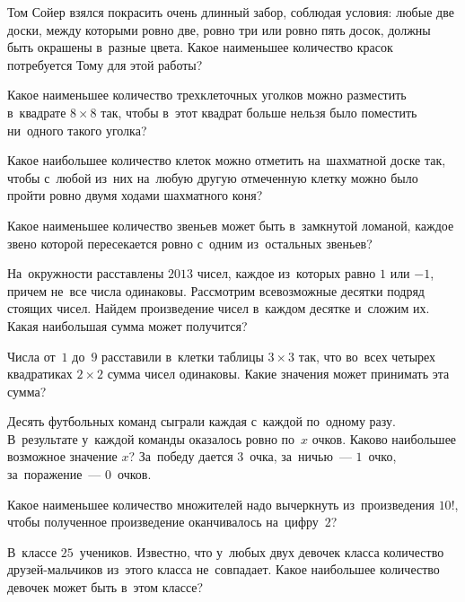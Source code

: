 \begin{problems}

\item
Том Сойер взялся покрасить очень длинный забор, соблюдая условия: любые две
доски, между которыми ровно две, ровно три или ровно пять досок, должны быть
окрашены в~разные цвета.
Какое наименьшее количество красок потребуется Тому для этой работы?

\item
Какое наименьшее количество трехклеточных уголков можно разместить
в~квадрате $8 \times 8$ так, чтобы в~этот квадрат больше нельзя было поместить
ни~одного такого уголка?

\item
Какое наибольшее количество клеток можно отметить на~шахматной доске так, чтобы
с~любой из~них на~любую другую отмеченную клетку можно было пройти ровно двумя
ходами шахматного коня?

\item
Какое наименьшее количество звеньев может быть в~замкнутой ломаной, каждое
звено которой пересекается ровно с~одним из~остальных звеньев?

\item
На~окружности расставлены $2013$ чисел, каждое из~которых равно $1$ или $-1$,
причем не~все числа одинаковы.
Рассмотрим всевозможные десятки подряд стоящих чисел.
Найдем произведение чисел в~каждом десятке и~сложим их.
Какая наибольшая сумма может получится?

\item
Числа от~$1$ до~$9$ расставили в~клетки таблицы $3 \times 3$ так, что во~всех
четырех квадратиках $2 \times 2$ сумма чисел одинаковы.
Какие значения может принимать эта сумма?

\item
Десять футбольных команд сыграли каждая с~каждой по~одному разу.
В~результате у~каждой команды оказалось ровно по~$x$ очков.
Каково наибольшее возможное значение $x$?
За~победу дается $3$~очка, за~ничью~--- $1$~очко, за~поражение~--- $0$~очков.

\item
Какое наименьшее количество множителей надо вычеркнуть из~произведения $10!$,
чтобы полученное произведение оканчивалось на~цифру~$2$?

\item
В~классе $25$~учеников.
Известно, что у~любых двух девочек класса количество друзей-мальчиков из~этого
класса не~совпадает.
Какое наибольшее количество девочек может быть в~этом классе?


\end{problems}
